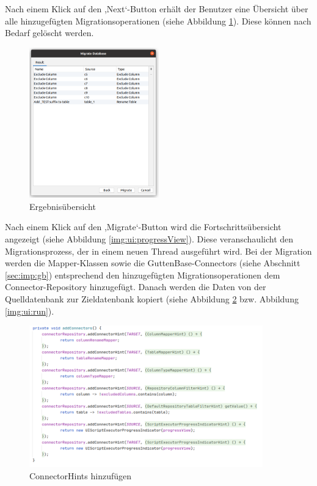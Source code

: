 	Nach einem Klick auf den ,Next‘-Button erhält der Benutzer eine Übersicht über alle hinzugefügten Migrationsoperationen (siehe Abbildung \ref{img:ui:resultView}). Diese können nach Bedarf gelöscht werden. \\
	\begin{figure}[H]
		\centering
		\includegraphics[width=0.5\textwidth]{images/ui/resultView}
		\caption{Ergebnisübersicht}
		\label{img:ui:resultView}
	\end{figure}
	Nach einem Klick auf den ,Migrate‘-Button wird die Fortschrittsübersicht angezeigt (siehe Abbildung \ref{img:ui:progressView}). Diese veranschaulicht den Migrationsprozess, der in einem neuen Thread ausgeführt wird. Bei der Migration werden die Mapper-Klassen sowie die GuttenBase-Connectors (siehe Abschnitt \ref{sec:imp:gb}) entsprechend den hinzugefügten Migrationsoperationen dem Connector-Repository hinzugefügt. Danach werden die Daten von der Quelldatenbank zur Zieldatenbank kopiert (siehe Abbildung \ref{img:ui:connectors} bzw. Abbildung \ref{img:ui:run}). \\
	\begin{figure}[H]
		\centering
		\includegraphics[width=0.9\textwidth]{images/ui/connectors}
		\caption{ConnectorHints hinzufügen}
		\label{img:ui:connectors}
	\end{figure}
